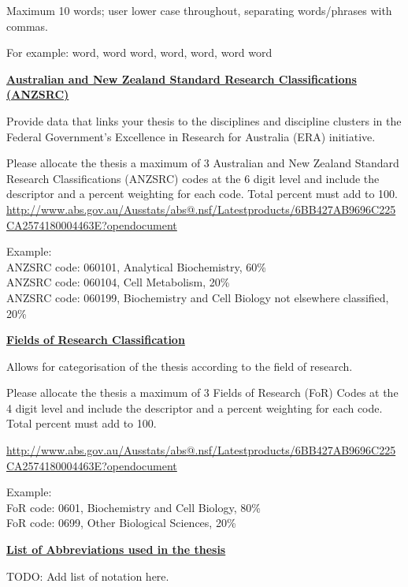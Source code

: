 Maximum 10 words; user lower case throughout, separating words/phrases with
commas.

For example: word, word word, word, word, word word

{\bf \underline{Australian and New Zealand Standard Research Classifications
(ANZSRC)}}

Provide data that links your thesis to the disciplines and discipline clusters
in the Federal Government’s Excellence in Research for Australia (ERA)
initiative.

Please allocate the thesis a maximum of 3 Australian and New Zealand Standard
Research Classifications (ANZSRC) codes at the 6 digit level and include the
descriptor and a percent weighting for each code. Total percent must add to
100.
\url{http://www.abs.gov.au/Ausstats/abs@.nsf/Latestproducts/6BB427AB9696C225CA2574180004463E?opendocument}

Example: \\
ANZSRC code: 060101, Analytical Biochemistry, 60\% \\
ANZSRC code: 060104, Cell Metabolism, 20\% \\
ANZSRC code: 060199, Biochemistry and Cell Biology not elsewhere classified, 20\%

{\bf \underline{Fields of Research Classification}}

Allows for categorisation of the thesis according to the field of research.

Please allocate the thesis a maximum of 3 Fields of Research (FoR) Codes at the
4 digit level and include the descriptor and a percent weighting for each code.
Total percent must add to 100.

\url{http://www.abs.gov.au/Ausstats/abs@.nsf/Latestproducts/6BB427AB9696C225CA2574180004463E?opendocument}

Example: \\
FoR code: 0601, Biochemistry and Cell Biology, 80\% \\
FoR code: 0699, Other Biological Sciences, 20\%

\tableofcontents

\listoffigures

\listoftables


\newpage

{\bf \underline{List of Abbreviations used in the thesis}}

TODO: Add list of notation here.
